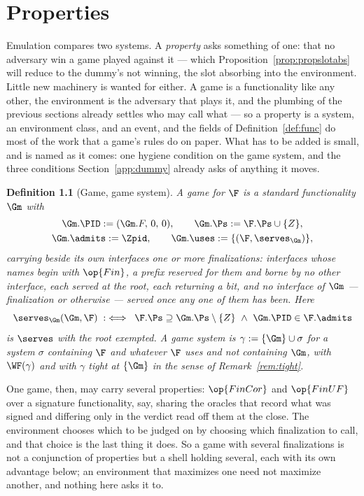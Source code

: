 \documentclass[10pt,oneside,openany]{book}
\theoremstyle{accentdef}
\newtheorem{definition}{Definition}[chapter]
\theoremstyle{accentplain}
\begin{document}

\chapter{Properties}\label{sec:properties}

Emulation compares two systems. A \emph{property} asks something of one: that no adversary win a game
played against it --- which Proposition~\ref{prop:propslotabs} will reduce to the dummy's not winning,
the slot absorbing into the environment. Little new machinery is wanted for either. A game is a
functionality like any other, the
environment is the adversary that plays it, and the plumbing of the previous sections already settles
who may call what --- so a property is a system, an environment class, and an event, and the fields of
Definition~\ref{def:func} do most of the work that a game's rules do on paper. What has to be added is
small, and is named as it comes: one hygiene condition on the game system, and the three conditions
Section~\ref{app:dummy} already asks of anything it moves.

\begin{definition}[Game, game system]\label{def:prop}
A \emph{game} for $\F$ is a standard functionality $\Gm$ with
\[
  \begin{gathered}
  \Gm.\PID := (\Gm.F,\,0,\,0), \qquad
  \Gm.\Ps := \F.\Ps \cup \{Z\}, \\
  \Gm.\admits := \Zpid, \qquad
  \Gm.\uses := \{(\F,\serves_{\Gm})\} ,
  \end{gathered}
\]
carrying beside its own interfaces one or more \emph{finalizations}: interfaces whose names begin
with $\op{Fin}$, a prefix reserved for them and borne by no other interface, each served at the
root, each returning a bit, and no interface of $\Gm$ --- finalization or otherwise --- served once
any one of them has been. Here
\[
  \serves_{\Gm}(\Gm,\F) \;:\iff\; \F.\Ps \supseteq \Gm.\Ps \setminus \{Z\}
  \ \wedge\ \Gm.\PID \in \F.\admits
\]
is $\serves$ with the root exempted. A \emph{game system} is $\gamma := \{\Gm\} \cup \sigma$ for a
system $\sigma$ containing $\F$ and whatever $\F$ uses and not containing $\Gm$, with $\WF(\gamma)$ and
with $\gamma$ \emph{tight at} $\{\Gm\}$ in the sense of Remark~\ref{rem:tight}.
\end{definition}

One game, then, may carry several properties: $\op{FinCor}$ and $\op{FinUF}$ over a signature
functionality, say, sharing the oracles that record what was signed and differing only in the
verdict read off them at the close. The environment chooses which to be judged on by choosing
which finalization to call, and that choice is the last thing it does. So a game with several
finalizations is not a conjunction of properties but a shell holding several, each with its own
advantage below; an environment that maximizes one need not maximize another, and nothing here
asks it to.
\end{document}
